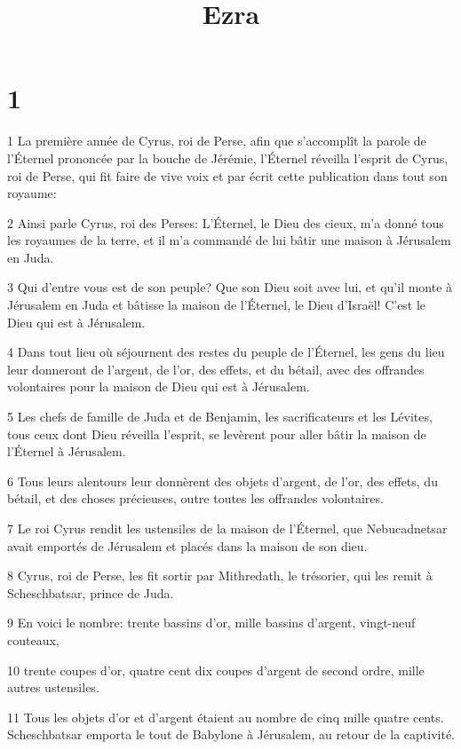 

\title{Ezra}


\chapter{1}

\par 1 La première année de Cyrus, roi de Perse, afin que s'accomplît la parole de l'Éternel prononcée par la bouche de Jérémie, l'Éternel réveilla l'esprit de Cyrus, roi de Perse, qui fit faire de vive voix et par écrit cette publication dans tout son royaume:
\par 2 Ainsi parle Cyrus, roi des Perses: L'Éternel, le Dieu des cieux, m'a donné tous les royaumes de la terre, et il m'a commandé de lui bâtir une maison à Jérusalem en Juda.
\par 3 Qui d'entre vous est de son peuple? Que son Dieu soit avec lui, et qu'il monte à Jérusalem en Juda et bâtisse la maison de l'Éternel, le Dieu d'Israël! C'est le Dieu qui est à Jérusalem.
\par 4 Dans tout lieu où séjournent des restes du peuple de l'Éternel, les gens du lieu leur donneront de l'argent, de l'or, des effets, et du bétail, avec des offrandes volontaires pour la maison de Dieu qui est à Jérusalem.
\par 5 Les chefs de famille de Juda et de Benjamin, les sacrificateurs et les Lévites, tous ceux dont Dieu réveilla l'esprit, se levèrent pour aller bâtir la maison de l'Éternel à Jérusalem.
\par 6 Tous leurs alentours leur donnèrent des objets d'argent, de l'or, des effets, du bétail, et des choses précieuses, outre toutes les offrandes volontaires.
\par 7 Le roi Cyrus rendit les ustensiles de la maison de l'Éternel, que Nebucadnetsar avait emportés de Jérusalem et placés dans la maison de son dieu.
\par 8 Cyrus, roi de Perse, les fit sortir par Mithredath, le trésorier, qui les remit à Scheschbatsar, prince de Juda.
\par 9 En voici le nombre: trente bassins d'or, mille bassins d'argent, vingt-neuf couteaux,
\par 10 trente coupes d'or, quatre cent dix coupes d'argent de second ordre, mille autres ustensiles.
\par 11 Tous les objets d'or et d'argent étaient au nombre de cinq mille quatre cents. Scheschbatsar emporta le tout de Babylone à Jérusalem, au retour de la captivité.

